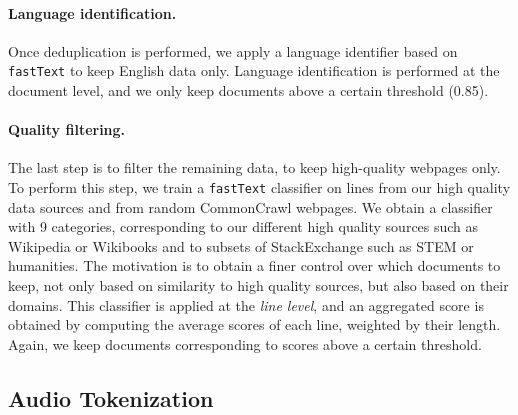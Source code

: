 \paragraph{Language identification.}
Once deduplication is performed, we apply a language identifier based on \texttt{fastText} to keep English data only.
Language identification is performed at the document level, and we only keep documents above a certain threshold (0.85).

\paragraph{Quality filtering.}
The last step is to filter the remaining data, to keep high-quality webpages only.
To perform this step, we train a \texttt{fastText} classifier on lines from our high quality data sources and from random CommonCrawl webpages.
We obtain a classifier with 9 categories, corresponding to our different high quality sources such as Wikipedia or Wikibooks and to subsets of StackExchange such as STEM or humanities.
The motivation is to obtain a finer control over which documents to keep, not only based on similarity to high quality sources, but also based on their domains.
This classifier is applied at the \emph{line level}, and an aggregated score is obtained by computing the average scores of each line, weighted by their length.
Again, we keep documents corresponding to scores above a certain threshold.



\subsection{Audio Tokenization}
\label{sec:mimi}


